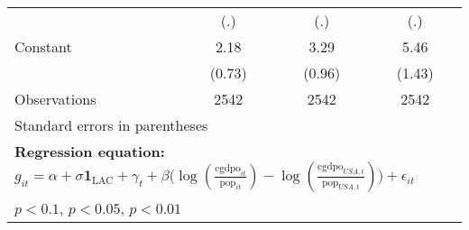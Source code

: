 \begin{sidewaystable}[htbp]
\begin{tabular}{l*{3}{c}}
                &      (.)         &      (.)         &      (.)         \\
\addlinespace
Constant        &     2.18\sym{***}&     3.29\sym{***}&     5.46\sym{***}\\
                &   (0.73)         &   (0.96)         &   (1.43)         \\
\midrule
Observations    &     2542         &     2542         &     2542         \\
\bottomrule
\multicolumn{4}{l}{\footnotesize Standard errors in parentheses}\\
\multicolumn{4}{l}{\footnotesize \textbf{Regression equation:} \(g_{it} = \alpha + \sigma \mathbf{1}_{\textrm{LAC}} + \gamma_t + \beta \big(\log (\frac{\textrm{cgdpo}_{it}}{\textrm{pop}_{it}} ) - \log (\frac{\textrm{cgdpo}_{USA,t}}{\textrm{pop}_{USA,t}}  ) \big) + \epsilon_{it}\)}\\
\multicolumn{4}{l}{\footnotesize \sym{*} \(p<0.1\), \sym{**} \(p<0.05\), \sym{***} \(p<0.01\)}\\
\end{tabular}
\end{sidewaystable}
